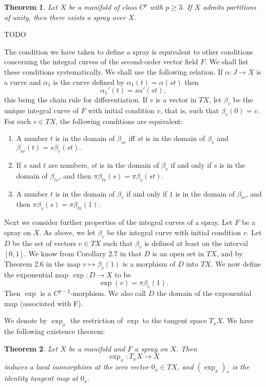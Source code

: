 \documentclass[a5paper,10pt,twoside]{article}
\theoremstyle{plain}
\newtheorem{teo}{Theorem}[section]
\theoremstyle{definition}
\theoremstyle{remark}
\begin{document}
\begin{teo}
Let $X$ be a manifold of class $C^{p}$ with $p\geq 3.$ If $X$ admits partitions of unity, then there exists a spray over $X.$
\end{teo}


TODO

The condition we have taken to define a spray is equivalent to other conditions concerning the integral curves of the second-order vector field $F.$ We shall list these conditions systematically. We shall use the following relation. If $\alpha:J\to X$ is a curve and $\alpha_1$ is the curve defined by $\alpha_1(t)=\alpha(st)$ then
$$
\alpha_1'(t)=s\alpha'(st),
$$
this being the chain rule for differentiation.
If $v$ is a vector in $TX$, let $\beta_v$ be the unique integral curve of $F$ with initial condition $v$, that is, such that $\beta_v(0)=v.$ For each $v\in TX$, the following conditions are equivalent:
%
\begin{enumerate}
	\item A number $t$ is in the domain of $\beta_{sv}$ iff $st$ is in the domain of $\beta_v$ and $\beta_{sv}(t)=s\beta_v(st).$
	\item If $s$ and $t$ are numbers, $st$ is in the domain of $\beta_v$ if and only if $s$ is in 	the domain of $\beta_{tv}$, and then $\pi\beta_{tv}(s)=\pi\beta_v(st).$
	\item A number $t$ is in the domain of $\beta_v$ if and only if $1$ is in the
	domain of $\beta_{tv}$, and then  $\pi\beta_{v}(s)=\pi\beta_{tv}(1).$
\end{enumerate}

Next we consider further properties of the integral curves of a spray. Let $F$ be a spray on $X.$ As above, we let $\beta_v$ be the integral curve with initial condition $v$. Let $D$ be the set of vectors $v\in TX$ such that $\beta_v$ is defined at least on the interval $[0, 1].$ We know from Corollary 2.7 in \cite{lang1999} that $D$ is an open set in $TX$, and by Theorem 2.6 in \cite{lang1999} the map $v\mapsto \beta_v(1)$ is a morphism of $D$ into $TX$. We now define the exponential map $\exp: D\to X$ to be
$$
\exp(v)=\pi\beta_v(1).
$$
Then $\exp$ is a $C^{p-2}$-morphism.  We also call $D$ the domain of the exponential map (associated with F).

We denote by $\exp_x$ the restriction of $\exp$ to the tangent space $T_xX$. We have the following existence theorem:

\begin{teo}
Let $X$ be a manifold and $F$ a spray on $X.$ Then
$$ \exp_x:T_xX\to X$$
induces a local isomorphism at the zero vector $0_x\in TX$, and $(\exp_x)_*$ is the identity tangent map at $0_x$.
\end{teo}
\end{document}

